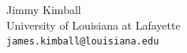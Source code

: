 \documentclass[10pt]{article} %
\begin{document}
\begin{minipage}[t]{.66\linewidth}
  Jimmy Kimball\\
  University of Louisiana at Lafayette\\
  \texttt{james.kimball@louisiana.edu}

  










\end{minipage}
\end{document}
